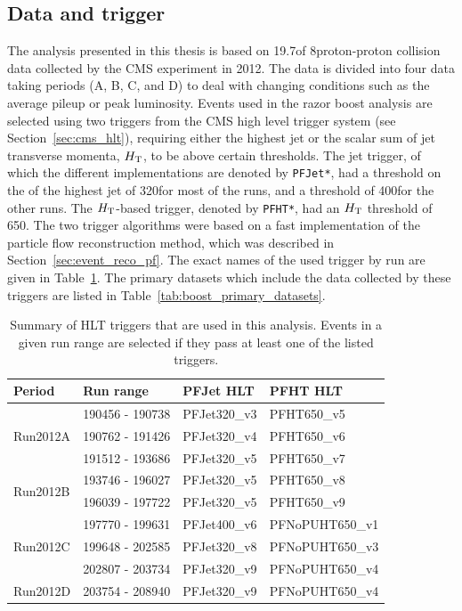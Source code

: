 
\subsection{Data and trigger \label{sec:boost_data_trigger}}

The analysis presented in this thesis is based on 19.7\fbinv of 8\TeV proton-proton collision data
collected by the CMS experiment in 2012.  The data is divided into four data taking periods
(A, B, C, and D) to deal with changing conditions such as the average pileup or peak luminosity. 
Events used in the razor boost analysis are selected using two triggers from the CMS high
level trigger system (see Section~\ref{sec:cms_hlt}), requiring either the highest jet \pt or the
scalar sum of jet transverse momenta, $H_{\mathrm{T}}$, to be above certain thresholds. 
The jet \pt trigger, of which the different implementations are denoted by \texttt{PFJet*},
had a threshold on the \pt of the highest \pt jet of 320\GeV for most of the runs, and a threshold
of 400\GeV for the other runs. 
The $H_{\mathrm{T}}$-based trigger, denoted by \texttt{PFHT*}, had an $H_{\mathrm{T}}$ threshold of 650\GeV. 
The two trigger algorithms were based on a fast implementation of the particle flow 
reconstruction method, which was described in Section~\ref{sec:event_reco_pf}.  
The exact names of the used trigger by run are given in Table~\ref{tab:boost_triggers}. The primary
datasets which include the data collected by these triggers are listed in
Table~\ref{tab:boost_primary_datasets}. 

\begin{table}[htdp]
\caption{Summary of HLT triggers that are used in this analysis. Events in a given run range
are selected if they pass at least one of the listed triggers. }	
\begin{center}
\begin{tabular}{l l l l}
\toprule
Period & Run range & PFJet HLT & PFHT HLT \\
\midrule
\multirow{3}{*}{Run2012A} & 190456 - 190738 & PFJet320\_v3 & PFHT650\_v5 \\
& 190762 - 191426 & PFJet320\_v4 & PFHT650\_v6 \\
& 191512 - 193686 & PFJet320\_v5 & PFHT650\_v7 \\
\midrule
\multirow{2}{*}{Run2012B} & 193746 - 196027 & PFJet320\_v5 & PFHT650\_v8 \\
& 196039 - 197722 & PFJet320\_v5 & PFHT650\_v9 \\
\midrule
\multirow{3}{*}{Run2012C} & 197770 - 199631 & PFJet400\_v6 & PFNoPUHT650\_v1 \\
& 199648 - 202585 & PFJet320\_v8 & PFNoPUHT650\_v3 \\
& 202807 - 203734 & PFJet320\_v9 & PFNoPUHT650\_v4 \\
\midrule
Run2012D & 203754 - 208940 & PFJet320\_v9 & PFNoPUHT650\_v4 \\
\bottomrule
\end{tabular}
\end{center}
\label{tab:boost_triggers}
\end{table}

